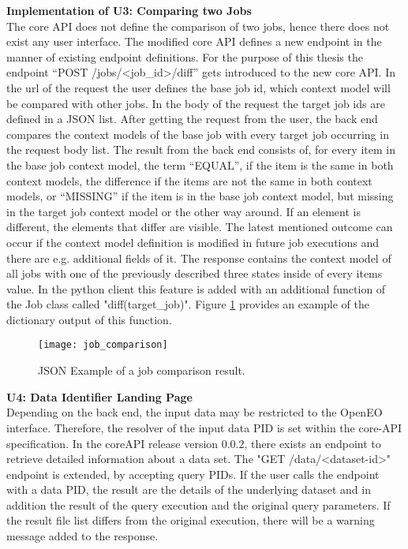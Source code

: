 \documentclass[draft,final]{vutinfth} %
\begin{document}
\textbf{Implementation of U3: Comparing two Jobs} \\
The core API does not define the comparison of two jobs, hence there does not exist any user interface. The modified core API defines a new endpoint in the manner of existing endpoint definitions. For the purpose of this thesis the endpoint  “POST /jobs/<job\_id>/diff” gets introduced to the new core API. In the url of the request the user defines the base job id, which context model will be compared with other jobs. In the body of the request the target job ids are defined in a JSON list. After getting the request from the user, the back end compares the context models of the base job with every target job occurring in the request body list. The result from the back end consists of, for every item in the base job context model, the term “EQUAL”, if the item is the same in both context models, the difference if the items are not the same in both context models, or “MISSING” if the item is in the base job context model, but missing in the target job context model or the other way around. If an element is different, the elements that differ are visible. The latest mentioned outcome can occur if the context model definition is modified in future job executions and there are e.g. additional fields of it. The response contains the context model of all jobs with one of the previously described three states inside of every items value. In the python client this feature is added with an additional function of the Job class called "diff(target\_job)". Figure \ref{fig:job_comparison} provides an example of the dictionary output of this function.

\begin{figure}[h]
	\centering
	\texttt{[image: job\_comparison]}
	\caption{JSON Example of a job comparison result.}
	\label{fig:job_comparison} %
\end{figure}

\textbf{U4: Data Identifier Landing Page} \\
Depending on the back end, the input data may be restricted to the OpenEO interface. Therefore, the resolver of the input data PID is set within the core-API specification. In the coreAPI release version 0.0.2, there exists an endpoint to retrieve detailed information about a data set. The "GET /data/<dataset-id>" endpoint is extended, by accepting query PIDs. If the user calls the endpoint with a data PID, the result are the details of the underlying dataset and in addition the result of the query execution and the original query parameters. If the result file list differs from the original execution, there will be a warning message added to the response. 
\end{document}
